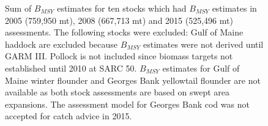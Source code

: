 	\begin{figure}
		\centering	
		\captionsetup{singlelinecheck=off}
		\caption[.]{Sum of $B_{MSY}$ estimates for ten stocks which had $B_{MSY}$ estimates in 2005 (759,950 mt), 2008 (667,713 mt) and 2015 (525,496 mt) assessments. The following stocks were excluded:  Gulf of Maine haddock are excluded because $B_{MSY}$  estimates were not derived until GARM III.  Pollock is not included since biomass targets not established until 2010 at SARC 50.  $B_{MSY}$ estimates for Gulf of Maine winter flounder and Georges Bank yellowtail flounder are not available as both stock assessments are based on swept area expansions.  The assessment model for Georges Bank cod was not accepted for catch advice in 2015.}
		\label{SumBMSY}
	\end{figure}
	\clearpage

